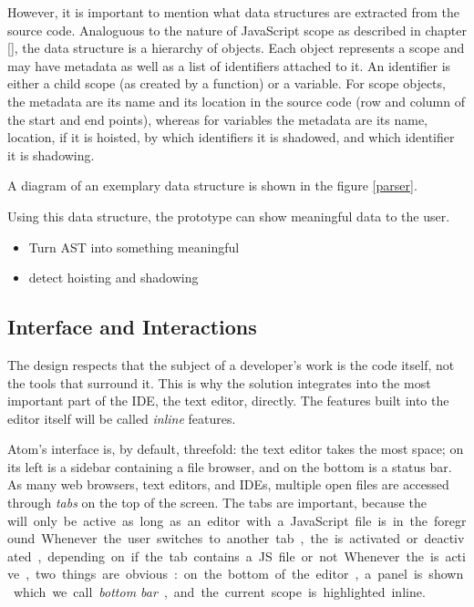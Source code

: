 However, it is important to mention what data structures are extracted
from the source code. Analoguous to the nature of JavaScript scope as
described in chapter \ref{}, the data structure is a hierarchy of
objects. Each object represents a scope and may have metadata as well as
a list of identifiers attached to it. An identifier is either a child
scope (as created by a function) or a variable. For scope objects, the
metadata are its name and its location in the source code (row and
column of the start and end points), whereas for variables the metadata
are its name, location, if it is hoisted, by which identifiers it is
shadowed, and which identifier it is shadowing.

A diagram of an exemplary data structure is shown in the figure
\ref{parser}.

Using this data structure, the prototype can show meaningful data to the
user.

\begin{itemize}
\itemsep1pt\parskip0pt
\item
  Turn AST into something meaningful
\item
  detect hoisting and shadowing
\end{itemize}

\subsection{Interface and
Interactions}\label{interface-and-interactions}

The design respects that the subject of a developer’s work is the code
itself, not the tools that surround it. This is why the solution
integrates into the most important part of the IDE, the text editor,
directly. The features built into the editor itself will be called
\emph{inline} features.

Atom’s interface is, by default, threefold: the text editor takes the
most space; on its left is a sidebar containing a file browser, and on
the bottom is a status bar. As many web browsers, text editors, and
IDEs, multiple open files are accessed through \emph{tabs} on the top of
the screen. The tabs are important, because the \si will only be active
as long as an editor with a JavaScript file is in the foreground.
Whenever the user switches to another tab, the \si is activated or
deactivated, depending on if the tab contains a JS file or not.

Whenever the \si is active, two things are obvious: on the bottom of the
editor, a panel is shown which we call \emph{bottom bar}, and the
current scope is highlighted inline.

